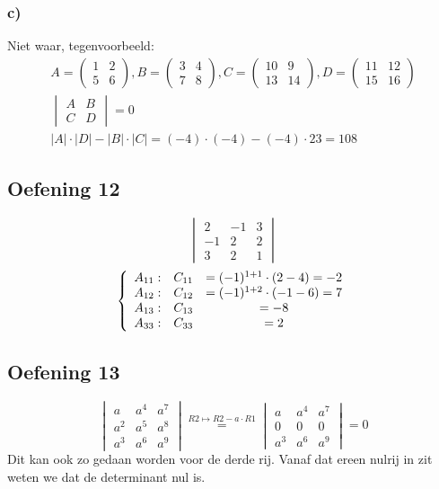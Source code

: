 \documentclass[lineaire_algebra_oplossingen.tex]{subfiles}
\begin{document}
\subsubsection*{c)}
Niet waar, tegenvoorbeeld:
\begin{gather*}
    A = 
    \begin{pmatrix}
        1 & 2\\
        5 & 6
    \end{pmatrix} 
    , B = 
    \begin{pmatrix}
        3 & 4\\
        7 & 8
    \end{pmatrix}
    , C = 
    \begin{pmatrix}
        10 & 9\\
        13 & 14
    \end{pmatrix}
    , D = 
    \begin{pmatrix}
        11 & 12\\
        15 & 16
    \end{pmatrix}\\
    \begin{vmatrix}
        A & B\\
        C & D
    \end{vmatrix}
    = 0\\
    |A| \cdot |D| - |B| \cdot |C| = (-4) \cdot (-4) - (-4) \cdot 23 = 108
\end{gather*}


\subsection{Oefening 12}
\[
\begin{vmatrix}
2 & -1 & 3\\
-1 & 2 & 2\\
3 & 2 & 1
\end{vmatrix}
\]
\[
\left\lbrace
\begin{array}{c c c}
A_{11}: &C_{11} &= (-1)^{1+1} \cdot (2 - 4) = -2\\
A_{12}: &C_{12} &= (-1)^{1+2} \cdot (-1 -6) = 7\\
A_{13}: &C_{13} &= -8\\
A_{33}: &C_{33} &= 2\\
\end{array}
\right.
\]
\subsection{Oefening 13}
$$
\begin{vmatrix}
a & a^4 & a^7\\
a^2 & a^5 & a^8\\
a^3 & a^6 & a^9
\end{vmatrix}
\overset{R2 \longmapsto R2 - a \cdot R1}{=}
\begin{vmatrix}
a & a^4 & a^7\\
0 & 0 & 0\\
a^3 & a^6 & a^9
\end{vmatrix}
= 0
$$
Dit kan ook zo gedaan worden voor de derde rij. Vanaf dat ereen nulrij in zit weten we dat de determinant nul is.
\end{document}
